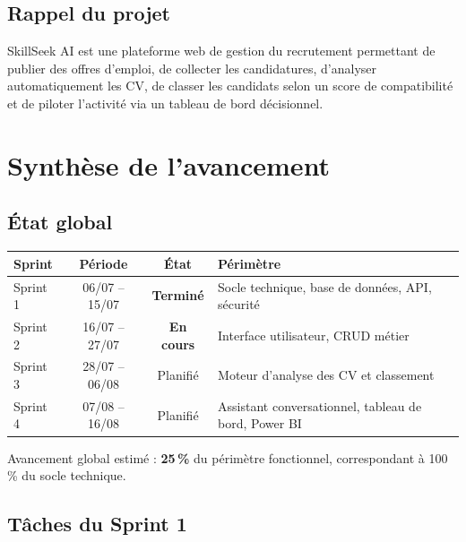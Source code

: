 \documentclass[11pt,a4paper]{article}
\begin{document}
\subsection{Rappel du projet}
SkillSeek AI est une plateforme web de gestion du recrutement permettant de publier des offres d'emploi, de collecter les candidatures, d'analyser automatiquement les CV, de classer les candidats selon un score de compatibilité et de piloter l'activité via un tableau de bord décisionnel.

\section{Synthèse de l'avancement}

\subsection{État global}

\begin{center}
\begin{tabular}{lccp{5.2cm}}
  \toprule
  \textbf{Sprint} & \textbf{Période} & \textbf{État} & \textbf{Périmètre} \\
  \midrule
  Sprint 1 & 06/07 -- 15/07 & \textcolor{vert}{\textbf{Terminé}} & Socle technique, base de données, API, sécurité \\[1mm]
  Sprint 2 & 16/07 -- 27/07 & \textcolor{accent}{\textbf{En cours}} & Interface utilisateur, CRUD métier \\[1mm]
  Sprint 3 & 28/07 -- 06/08 & Planifié & Moteur d'analyse des CV et classement \\[1mm]
  Sprint 4 & 07/08 -- 16/08 & Planifié & Assistant conversationnel, tableau de bord, Power BI \\
  \bottomrule
\end{tabular}
\end{center}

\vspace{2mm}
\noindent Avancement global estimé : \textbf{25\,\%} du périmètre fonctionnel, correspondant à 100\,\% du socle technique.

\subsection{Tâches du Sprint 1}
\end{document}
